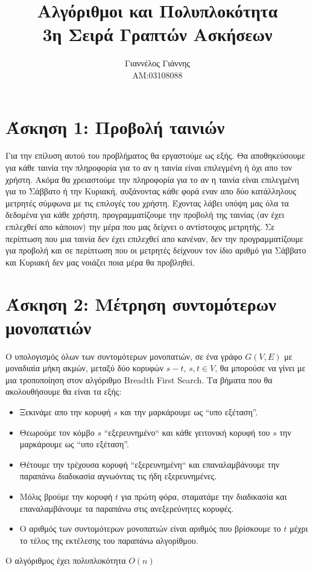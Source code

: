\documentclass[a4paper,12pt]{report}
\title{ Αλγόριθμοι και Πολυπλοκότητα \\ 3η Σειρά Γραπτών Ασκήσεων}
\author{Γιαννέλος Γιάννης\\ΑΜ:03108088}
\begin{document}
\maketitle

\section*{Άσκηση 1: Προβολή ταινιών}
Για την επίλυση αυτού του προβλήματος θα εργαστούμε ως εξής. Θα αποθηκεύσουμε για κάθε ταινία την πληροφορία για το αν η ταινία είναι επιλεγμένη ή όχι απο τον χρήστη. Ακόμα θα χρειαστούμε την πληροφορία για το αν η ταινία είναι επιλεγμένη για το Σάββατο ή την Κυριακή, αυξάνοντας κάθε φορά εναν απο δύο κατάλληλους μετρητές σύμφωνα με τις επιλογές του χρήστη. Έχοντας λάβει υπόψη μας όλα τα δεδομένα για κάθε χρήστη, προγραμματίζουμε την προβολή της ταινίας (αν έχει επιλεχθεί απο κάποιον) την μέρα που μας δείχνει ο αντίστοιχος μετρητής. Σε περίπτωση που μια ταινία δεν έχει επιλεχθεί απο κανέναν, δεν την προγραμματίζουμε για προβολή και σε περίπτωση που οι μετρητές δείχνουν τον ίδιο αριθμό για Σάββατο και Κυριακή δεν μας νοιάζει ποια μέρα θα προβληθεί.   

\section*{Άσκηση 2: Μέτρηση συντομότερων μονοπατιών}
Ο υπολογισμός όλων των συντομότερων μονοπατιών, σε ένα γράφο $G(V,E)$ με μοναδιαία μήκη ακμών, μεταξύ δύο κορυφών $s-t$, $s,t \in V$, θα μπορούσε να γίνει με μια τροποποίηση στον αλγόριθμο Breadth First Search. Τα βήματα που θα ακολουθήσουμε θα είναι τα εξής:
\begin{itemize}
 \item Ξεκινάμε απο την κορυφή $s$ και την μαρκάρουμε ως ``υπο εξέταση''.
 \item Θεωρούμε τον κόμβο $s$ ``εξερευνημένο`` και κάθε γειτονική κορυφή του $s$ την μαρκάρουμε ως ``υπο εξέταση''.
 \item Θέτουμε την τρέχουσα κορυφή ``εξερευνημένη`` και επαναλαμβάνουμε την παραπάνω διαδικασία αγνωόντας τις ήδη εξερευνημένες.
 \item Mόλις βρούμε την κορυφή $t$ για πρώτη φόρα, σταματάμε την διαδικασία και επαναλαμβάνουμε τα παραπάνω στις ανεξερεύνητες κορυφές.
 \item Ο αριθμός των συντομότερων μονοπατιών είναι αριθμός που βρίσκουμε το $t$ μέχρι το τέλος της εκτέλεσης του παραπάνω αλγορίθμου. 
\end{itemize}
O αλγόριθμος έχει πολυπλοκότητα $O(n)$     
\end{document}
